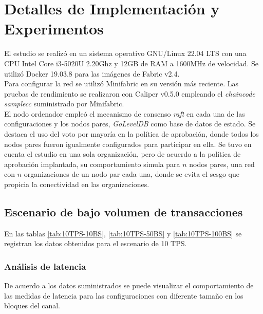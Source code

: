 \chapter{Detalles de Implementación y Experimentos}\label{chapter:implementation}

El estudio se realiz\'o en un sistema operativo GNU/Linux 22.04 LTS con una CPU Intel Core i3-5020U 2.20Ghz y 12GB de RAM a 1600MHz de velocidad. Se utiliz\'o Docker 19.03.8 para las im\'agenes de Fabric v2.4.\\

Para configurar la red se utiliz\'o Minifabric en su versi\'on m\'as reciente. Las pruebas de rendimiento se realizaron con Caliper v0.5.0 empleando el \emph{chaincode} \emph{samplecc} suministrado por Minifabric.\\

El nodo ordenador emple\'o el mecanismo de consenso \emph{raft} en cada una de las configuraciones y los nodos pares, \emph{GoLevelDB} como base de datos de estado. Se destaca el uso del voto por mayor\'ia en la pol\'itica de aprobaci\'on, donde todos los nodos pares fueron igualmente configurados para participar en ella. Se tuvo en cuenta el estudio en una sola organizaci\'on, pero de acuerdo a la pol\'itica de aprobaci\'on implantada, su comportamiento simula para $n$ nodos pares, una red con $n$ organizaciones de un nodo par cada una, donde se evita el sesgo que propicia la conectividad en las organizaciones.

\newpage
\section{Escenario de bajo volumen de transacciones}

En las tablas \ref{tab:10TPS-10BS}, \ref{tab:10TPS-50BS} y \ref{tab:10TPS-100BS} se registran los datos obtenidos para el escenario de 10 TPS.\\

\subsection{An\'alisis de latencia}
De acuerdo a los datos suministrados se puede visualizar el comportamiento de las medidas de latencia para las configuraciones con diferente tama\~no en los bloques del canal.\\

